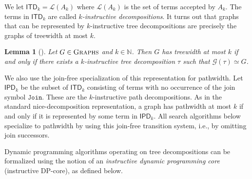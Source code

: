 \documentclass[11pt,a4paper]{article}
\newtheorem{lemma}[theorem]{Lemma}
\newcommand{\treeautomaton}{A}
\newcommand{\lang}{\mathcal{L}}
\newcommand{\treewidthvalue}{k}
\newcommand{\agraph}{G}
\newcommand{\N}{\mathbb{N}}
\newcommand{\abag}{\mathfrak{b}}
\newcommand{\jointype}{\mathtt{Join}}
\newcommand{\allabstractdecompositionspathwidth}[1]{\mathsf{IPD}_{#1}}
\newcommand{\allabstractdecompositionstreewidth}[1]{\mathsf{ITD}_{#1}}
\newcommand{\abstractdecomposition}{\tau}
\newcommand{\vertexone}{u}
\newcommand{\vertextwo}{v}
\newcommand{\allgraphs}{\textsc{Graphs}}
\newcommand{\graphfunction}{\mathcal{G}}
\begin{document}

We let $\allabstractdecompositionstreewidth{k}  = \lang(\treeautomaton_{\treewidthvalue})$ where $\lang(\treeautomaton_{\treewidthvalue})$ is the set of terms accepted by
$\treeautomaton_{\treewidthvalue}$. The terms in $\allabstractdecompositionstreewidth{k}$ are called {\em $\treewidthvalue$-instructive decompositions}. It turns out that graphs that can be represented by
$\treewidthvalue$-instructive tree decompositions are precisely the graphs of treewidth at most $\treewidthvalue$.



\begin{lemma}
[\cite{de2023width}]
\label{lemma:TreewidthIsTreelikeConfirmation}
Let $\agraph\in \allgraphs$ and $\treewidthvalue\in \N$. Then $\agraph$ has
treewidth at most $\treewidthvalue$ if and only if there exists a $\treewidthvalue$-instructive tree decomposition $\abstractdecomposition$ such that $\graphfunction(\abstractdecomposition) \simeq \agraph$.
\end{lemma}

We also use the join-free specialization of this representation for pathwidth. Let $\allabstractdecompositionspathwidth{\treewidthvalue}$ be the subset of $\allabstractdecompositionstreewidth{\treewidthvalue}$ consisting of terms with no occurrence of the join symbol $\jointype$. These are the $\treewidthvalue$-instructive path decompositions. As in the standard nice-decomposition representation, a graph has pathwidth at most $\treewidthvalue$ if and only if it is represented by some term in $\allabstractdecompositionspathwidth{\treewidthvalue}$. All search algorithms below specialize to pathwidth by using this join-free transition system, i.e., by omitting join successors.

Dynamic programming algorithms operating on tree decompositions can be formalized using the notion of an {\em instructive dynamic programming core} (instructive DP-core), as defined below.
\end{document}

